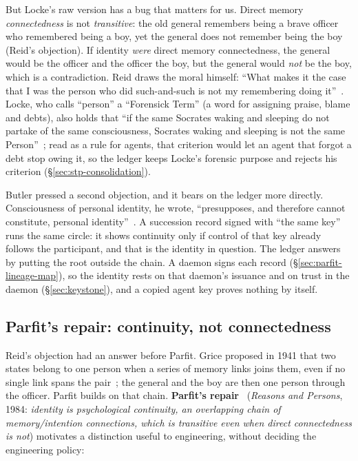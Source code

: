 \documentclass[11pt,a4paper]{article}
\theoremstyle{definition}
\begin{document}
But Locke's raw version has a bug that matters for us. Direct memory
\emph{connectedness} is not \emph{transitive}: the old general remembers being a
brave officer who remembered being a boy, yet the general does not remember being
the boy (Reid's objection). If identity \emph{were} direct memory connectedness,
the general would be the officer and the officer the boy, but the general would
\emph{not} be the boy, which is a contradiction. Reid draws the moral himself: ``What
makes it the case that I was the person who did such-and-such is not my
remembering doing it''~. Locke, who calls ``person'' a
``Forensick Term'' (a word for assigning praise, blame and debts), also holds that ``if the same Socrates waking and sleeping
do not partake of the same consciousness, Socrates waking and sleeping is not
the same Person''~; read as a rule for agents, that
criterion would let an agent that forgot a debt stop owing it, so the ledger
keeps Locke's forensic purpose and rejects his criterion
(\S\ref{sec:stp-consolidation}).

Butler pressed a second objection, and it bears on the ledger more directly.
Consciousness of personal identity, he wrote, ``presupposes, and therefore
cannot constitute, personal identity''~. A
succession record signed with ``the same key'' runs the same circle: it shows
continuity only if control of that key already follows the participant, and
that is the identity in question. The ledger answers by putting the root
outside the chain. A daemon signs each record
(\S\ref{sec:parfit-lineage-map}), so the identity rests on that daemon's
issuance and on trust in the daemon (\S\ref{sec:keystone}), and a copied agent
key proves nothing by itself.

\subsection{Parfit's repair: continuity, not connectedness}

%
Reid's objection had an answer before Parfit. Grice proposed in 1941 that two
states belong to one person when a series of memory links joins them, even if
no single link spans the pair~; the general and the
boy are then one person through the officer. Parfit builds on that chain.
\textbf{Parfit's repair}~ (\textit{Reasons and Persons}, 1984:
\emph{identity is psychological continuity, an overlapping chain of
memory/intention connections, which is transitive even when direct connectedness
is not}) motivates a distinction useful to engineering, without deciding the engineering policy:
\end{document}
